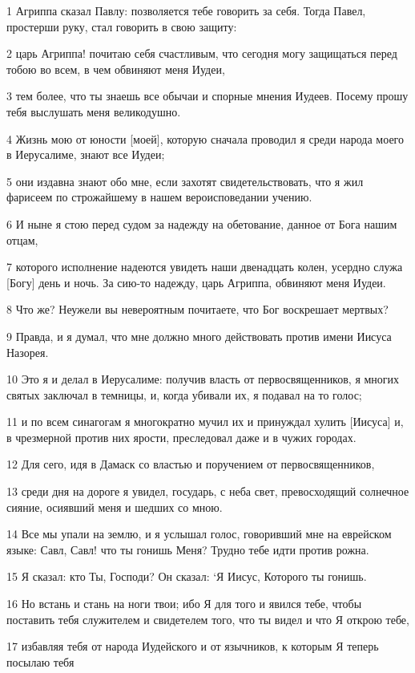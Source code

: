 \par 1 Агриппа сказал Павлу: позволяется тебе говорить за себя. Тогда Павел, простерши руку, стал говорить в свою защиту:
\par 2 царь Агриппа! почитаю себя счастливым, что сегодня могу защищаться перед тобою во всем, в чем обвиняют меня Иудеи,
\par 3 тем более, что ты знаешь все обычаи и спорные мнения Иудеев. Посему прошу тебя выслушать меня великодушно.
\par 4 Жизнь мою от юности [моей], которую сначала проводил я среди народа моего в Иерусалиме, знают все Иудеи;
\par 5 они издавна знают обо мне, если захотят свидетельствовать, что я жил фарисеем по строжайшему в нашем вероисповедании учению.
\par 6 И ныне я стою перед судом за надежду на обетование, данное от Бога нашим отцам,
\par 7 которого исполнение надеются увидеть наши двенадцать колен, усердно служа [Богу] день и ночь. За сию-то надежду, царь Агриппа, обвиняют меня Иудеи.
\par 8 Что же? Неужели вы невероятным почитаете, что Бог воскрешает мертвых?
\par 9 Правда, и я думал, что мне должно много действовать против имени Иисуса Назорея.
\par 10 Это я и делал в Иерусалиме: получив власть от первосвященников, я многих святых заключал в темницы, и, когда убивали их, я подавал на то голос;
\par 11 и по всем синагогам я многократно мучил их и принуждал хулить [Иисуса] и, в чрезмерной против них ярости, преследовал даже и в чужих городах.
\par 12 Для сего, идя в Дамаск со властью и поручением от первосвященников,
\par 13 среди дня на дороге я увидел, государь, с неба свет, превосходящий солнечное сияние, осиявший меня и шедших со мною.
\par 14 Все мы упали на землю, и я услышал голос, говоривший мне на еврейском языке: Савл, Савл! что ты гонишь Меня? Трудно тебе идти против рожна.
\par 15 Я сказал: кто Ты, Господи? Он сказал: `Я Иисус, Которого ты гонишь.
\par 16 Но встань и стань на ноги твои; ибо Я для того и явился тебе, чтобы поставить тебя служителем и свидетелем того, что ты видел и что Я открою тебе,
\par 17 избавляя тебя от народа Иудейского и от язычников, к которым Я теперь посылаю тебя
